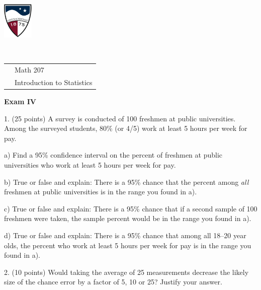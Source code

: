 \documentclass[10pt]{article}
\begin{document}
\href{http://www.su.edu}{\includegraphics[height=1.75cm]{sulogo.eps}}
\vspace{-1.69cm}

{{\ }\hfill\small
\begin{tabular}{cl}
& Math 207\\
& Introduction to Statistics\\
\end{tabular}
}
\begin{center}
\textbf{\large  Exam IV}
\end{center}
\medskip

1. (25 points) A survey is conducted of 100 freshmen at public universities.
Among the surveyed  students, 80\% (or 4/5) work at least 5 hours per week for pay.

\hspace{20pt} a) Find a 95\% confidence interval
on the  percent of freshmen at public universities who work at least 5 hours per week for pay.
\vspace{2.3in}

\hspace{20pt} b) True or false and explain:  There is a 95\% chance that the
percent among \textit{all} freshmen at public universities is in the range you found in a).
\vspace{1.5in}

\hspace{20pt} c) True or false and explain:  There is a 95\% chance that
if a second sample of 100 freshmen were taken,
the sample percent would be in the range you found in a).
\vspace{1.5in}

\hspace{20pt} d) True or false and explain:  There is a 95\% chance that 
 among all 18--20 year olds, the percent who work at least 5 hours per week for pay 
is in the range you found in a).
\vspace{1in}
\vfill
\eject
{\ }



2. (10 points)
Would taking the average of 25 measurements decrease
the likely size of the chance error by a factor of 5, 10 or 25? Justify your answer.
\vspace{1.5in}
\end{document}
